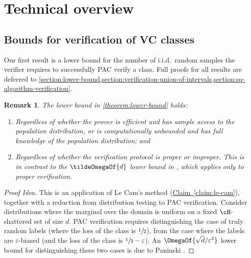 \documentclass[11pt]{article}
\newcommand{\expref}[2]{\texorpdfstring{\hyperref[#2]{#1~\ref{#2}}}{#1~\ref{#2}}}
\newtheorem{theorem}{Theorem}[section]
\newtheorem{remark}[theorem]{Remark}
\begin{document}
\section{Technical overview}\label{section:technical-overview}

\subsection{Bounds for verification of VC classes}

Our first result is a lower bound for the number of i.i.d.\ random samples the verifier requires to successfully PAC verify a class. Full proofs for all results are deferred to \cref{section:lower-bound,section:verification-union-of-intervals,section:sq-algorithm-verification}.




\begin{remark}
	The lower bound in \cref{theorem:lower-bound} holds:
	\begin{enumerate}
		\item{
			Regardless of whether the prover is efficient and has sample access to the population distribution, or is computationally unbounded and has full knowledge of the population distribution; and
		}
		\item{
			Regardless of whether the verification protocol is proper or improper. This is in contrast to the $\tildeOmegaOf{d}$ lower bound in %
			\cite[Lemma 4.1]{GoldwasserRSY21}, %
			which applies only to proper verification.
		}
	\end{enumerate}
\end{remark}

\begin{proof}[Proof Idea]
	This is an application of Le Cam's method (\expref{Claim}{claim:le-cam}), together with a reduction from distribution testing to PAC verification.  
	Consider distributions where the marginal over the domain is uniform on a fixed $\cH$-shattered set of size $d$.
	PAC verification requires distinguishing the case of truly random labels (where the loss of the class is $\sfrac{1}{2}$), from the case where the labels are $\varepsilon$-biased (and the loss of the class is $\sfrac{1}{2}-\varepsilon$). An $\OmegaOf{\sqrt{d}/\varepsilon^2}$ lower bound for distinguishing these two cases is due to Paninski \cite{DBLP:journals/tit/Paninski08}.
\end{proof}
\end{document}
